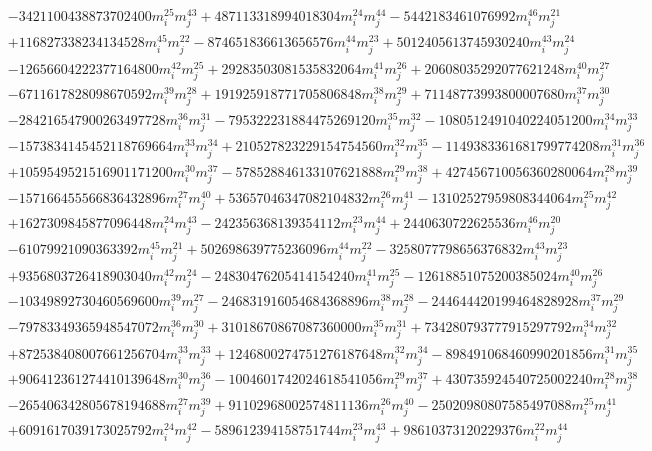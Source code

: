 {\begin{align*}
&-3421100438873702400m_i^{25}m_j^{43}+487113318994018304m_i^{24}m_j^{44}-5442183461076992m_i^{46}m_j^{21}\\
&+116827338234134528m_i^{45}m_j^{22}-874651836613656576m_i^{44}m_j^{23}+5012405613745930240m_i^{43}m_j^{24}\\
&-12656604222377164800m_i^{42}m_j^{25}+29283503081535832064m_i^{41}m_j^{26}+20608035292077621248m_i^{40}m_j^{27}\\
&-6711617828098670592m_i^{39}m_j^{28}+191925918771705806848m_i^{38}m_j^{29}+71148773993800007680m_i^{37}m_j^{30}\\
&-284216547900263497728m_i^{36}m_j^{31}-795322231884475269120m_i^{35}m_j^{32}-1080512491040224051200m_i^{34}m_j^{33}\\
&-1573834145452118769664m_i^{33}m_j^{34}+210527823229154754560m_i^{32}m_j^{35}-1149383361681799774208m_i^{31}m_j^{36}\\
&+1059549521516901171200m_i^{30}m_j^{37}-578528846133107621888m_i^{29}m_j^{38}+427456710056360280064m_i^{28}m_j^{39}\\
&-157166455566836432896m_i^{27}m_j^{40}+53657046347082104832m_i^{26}m_j^{41}-13102527959808344064m_i^{25}m_j^{42}\\
&+1627309845877096448m_i^{24}m_j^{43}-242356368139354112m_i^{23}m_j^{44}+2440630722625536m_i^{46}m_j^{20}\\
&-61079921090363392m_i^{45}m_j^{21}+502698639775236096m_i^{44}m_j^{22}-3258077798656376832m_i^{43}m_j^{23}\\
&+9356803726418903040m_i^{42}m_j^{24}-24830476205414154240m_i^{41}m_j^{25}-12618851075200385024m_i^{40}m_j^{26}\\
&-10349892730460569600m_i^{39}m_j^{27}-246831916054684368896m_i^{38}m_j^{28}-244644420199464828928m_i^{37}m_j^{29}\\
&-79783349365948547072m_i^{36}m_j^{30}+31018670867087360000m_i^{35}m_j^{31}+734280793777915297792m_i^{34}m_j^{32}\\
&+872538408007661256704m_i^{33}m_j^{33}+1246800274751276187648m_i^{32}m_j^{34}-898491068460990201856m_i^{31}m_j^{35}\\
&+906412361274410139648m_i^{30}m_j^{36}-1004601742024618541056m_i^{29}m_j^{37}+430735924540725002240m_i^{28}m_j^{38}\\
&-265406342805678194688m_i^{27}m_j^{39}+91102968002574811136m_i^{26}m_j^{40}-25020980807585497088m_i^{25}m_j^{41}\\
&+6091617039173025792m_i^{24}m_j^{42}-589612394158751744m_i^{23}m_j^{43}+98610373120229376m_i^{22}m_j^{44}\\

\end{align*}}
